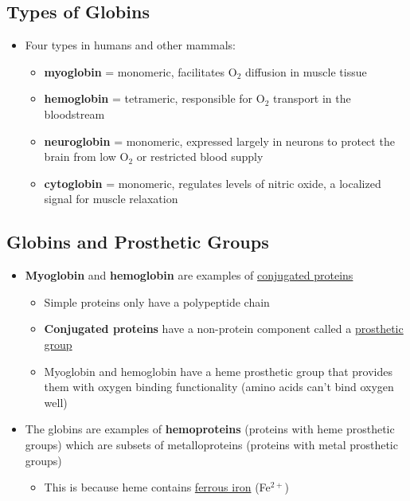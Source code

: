 \documentclass[10pt]{article}
\begin{document}
\subsection*{Types of Globins}
\begin{itemize}
    \item Four types in humans and other mammals:
    \begin{itemize}
        \item \textbf{myoglobin} = monomeric, facilitates O$_2$ diffusion in muscle tissue
        \item \textbf{hemoglobin} = tetrameric, responsible for O$_2$ transport in the bloodstream
        \item \textbf{neuroglobin} = monomeric, expressed largely in neurons to protect the brain from low O$_2$ or restricted blood supply
        \item \textbf{cytoglobin} = monomeric, regulates levels of nitric oxide, a localized signal for muscle relaxation
    \end{itemize}
\end{itemize}

\subsection*{Globins and Prosthetic Groups}
\begin{itemize}
    \item \textbf{Myoglobin} and \textbf{hemoglobin} are examples of \underline{conjugated proteins}
    \begin{itemize}
        \item Simple proteins only have a polypeptide chain
        \item \textbf{Conjugated proteins} have a non-protein component called a \underline{prosthetic group}
        \item Myoglobin and hemoglobin have a heme prosthetic group that provides them with oxygen binding functionality (amino acids can't bind oxygen well)
    \end{itemize}
    \item The globins are examples of \textbf{hemoproteins} (proteins with heme prosthetic groups) which are subsets of metalloproteins (proteins with metal prosthetic groups)
    \begin{itemize}
        \item This is because heme contains \underline{ferrous iron} (Fe$^{2+}$)
    \end{itemize}
\end{itemize}
\end{document}
